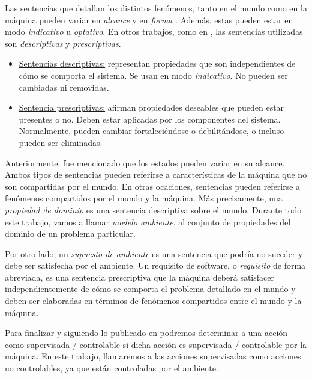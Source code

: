 Las sentencias que detallan los distintos fenómenos, tanto en el mundo como en la máquina pueden variar en
\emph{alcance} y en \emph{forma} \cite{Parnas95functionaldocuments,Jackson:1995:SRA:210207}. Además, estas pueden estar en modo \emph{indicativo} u \emph{optativo}. En
otros trabajos, como en \cite{van2009requirements}, las sentencias utilizadas son \emph{descriptivas} y \emph{prescriptivas}.

\begin{itemize}
    \item \underline{Sentencias descriptivas:} representan propiedades que son independientes de cómo se comporta el
    sistema. Se usan en modo \emph{indicativo}. No pueden ser cambiadas ni removidas.
    \item \underline{Sentencia prescriptivas:} afirman propiedades deseables que pueden estar presentes o no. Deben estar
    aplicadas por los componentes del sistema. Normalmente, pueden cambiar fortaleciéndose o debilitándose, o incluso
    pueden ser eliminadas. 
\end{itemize}

Anteriormente, fue mencionado que los estados pueden variar en su alcance. Ambos tipos de sentencias pueden referirse a
características de la máquina que no son compartidas por el mundo. En otras ocaciones, sentencias pueden referirse a
fenómenos compartidos por el mundo y la máquina. Más precisamente, una \emph{propiedad de dominio} es
una sentencia descriptiva sobre el mundo. Durante todo este trabajo, vamos a llamar \emph{modelo ambiente}, al conjunto
de propiedades del dominio de un problema particular.

Por otro lado, un \emph{supuesto de ambiente} es una sentencia que podría no suceder y debe ser satisfecha por el
ambiente. Un requisito de software, o \emph{requisito} de forma abreviada, es una sentencia prescriptiva que la máquina
deberá satisfacer independientemente de cómo se comporta el problema detallado en el mundo y deben ser elaboradas en
términos de fenómenos compartidos entre el mundo y la máquina.

Para finalizar y siguiendo lo publicado en \cite{VanLamsweerde:2001:GRE:882477.883624, 879820} podremos determinar a una acción como supervisada / controlable si
dicha acción es supervisada / controlable por la máquina. En este trabajo, llamaremos a las acciones supervisadas como
acciones no controlables, ya que están controladas por el ambiente.
